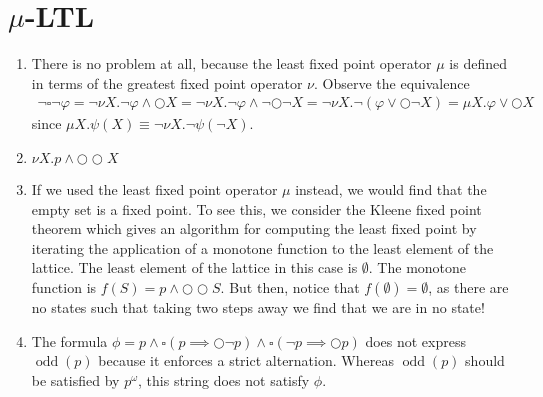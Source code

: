 \documentclass[letterpaper,11pt]{article}
\newcommand{\question}{\section}
\newcommand{\always}{\square}
\newcommand{\step}{\bigcirc}
\newcommand{\parens}[1]{\left(#1\right)}
\DeclareMathOperator{\Odd}{odd}
\newcommand{\odd}[1]{\Odd{\parens{#1}}}
\begin{document}
\question{$\mu$-LTL}

\begin{enumerate}
    \item There is no problem at all, because the least fixed point operator
        $\mu$ is defined in terms of the greatest fixed point operator $\nu$.
        Observe the equivalence
        \begin{align*}
            \neg \always \neg \varphi
            = \neg \nu X . \neg \varphi \land \step X
            = \neg \nu X . \neg \varphi \land \neg \step \neg X
            = \neg \nu X . \neg (\varphi \lor \step \neg X)
            = \mu X . \varphi \lor \step X
        \end{align*}
        since $\mu X . \psi(X) \equiv \neg \nu X . \neg \psi (\neg X)$.

    \item $\nu X . p \land \step \step X$

    \item If we used the least fixed point operator $\mu$ instead, we would
        find that the empty set is a fixed point. To see this, we consider the
        Kleene fixed point theorem which gives an algorithm for computing the
        least fixed point by iterating the application of a monotone function
        to the least element of the lattice. The least element of the lattice
        in this case is $\emptyset$.
        The monotone function is $f(S) = p \land \step \step S$.
        But then, notice that $f(\emptyset) = \emptyset$, as there are no
        states such that taking two steps away we find that we are in no
        state!

    \item The formula
        $
        \phi =
        p
        \land
        \always (p \implies \step \neg p)
        \land
        \always (\neg p \implies \step p)
        $
        does not express $\odd{p}$ because it enforces a strict alternation.
        Whereas $\odd{p}$ should be satisfied by $p^\omega$, this string does
        not satisfy $\phi$.
\end{enumerate}
\end{document}
